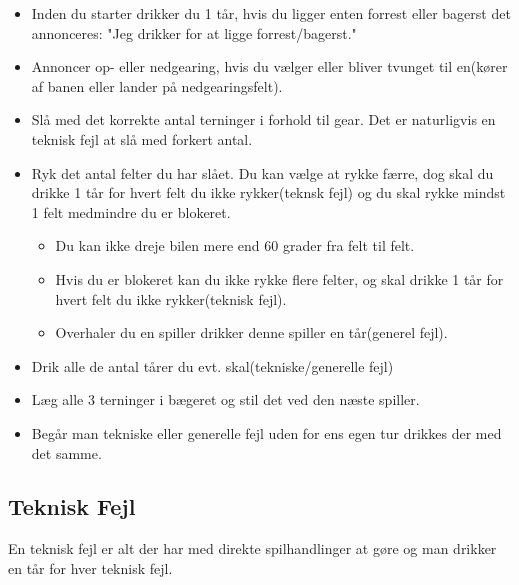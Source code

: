 \documentclass[12pt]{article}
\begin{document}
\begin{itemize}
	\item Inden du starter drikker du 1 tår, hvis du ligger enten forrest eller bagerst det annonceres: "Jeg drikker for at ligge forrest/bagerst."
	\item Annoncer op- eller nedgearing, hvis du vælger eller bliver tvunget til en(kører af banen eller lander på nedgearingsfelt).
	\item Slå med det korrekte antal terninger i forhold til gear. Det er naturligvis en teknisk fejl at slå med forkert antal.
	\item Ryk det antal felter du har slået. Du kan vælge at rykke færre, dog skal du drikke 1 tår for hvert felt du ikke rykker(teknsk fejl) og du skal rykke mindst 1 felt medmindre du er blokeret.
\begin{itemize}
		\item Du kan ikke dreje bilen mere end 60 grader fra felt til felt.
		\item Hvis du er blokeret kan du ikke rykke flere felter, og skal drikke 1 tår for hvert felt du ikke rykker(teknisk fejl).
		\item Overhaler du en spiller drikker denne spiller en tår(generel fejl).
\end{itemize}
	\item Drik alle de antal tårer du evt. skal(tekniske/generelle fejl)
	\item Læg alle 3 terninger i bægeret og stil det ved den næste spiller.
	\item Begår man tekniske eller generelle fejl uden for ens egen tur drikkes der med det samme.
\end{itemize}


\subsection*{Teknisk Fejl}

En teknisk fejl er alt der har med direkte spilhandlinger at gøre og man drikker en tår for hver teknisk fejl.
\end{document}
